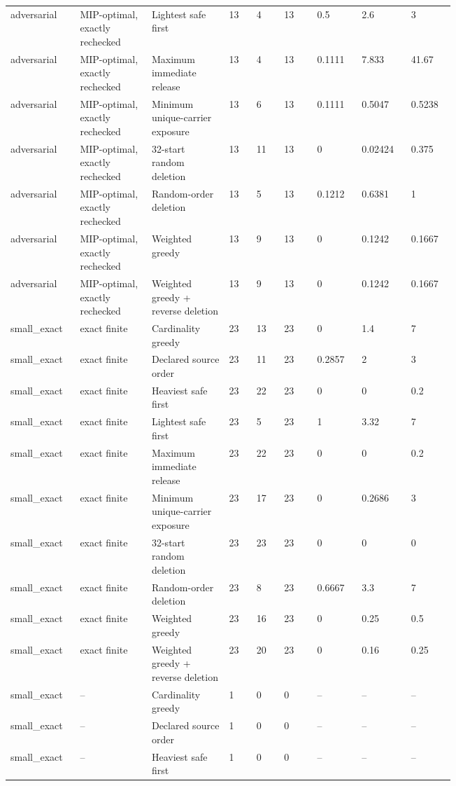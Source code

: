 {\begin{longtable}{p{0.075\linewidth}p{0.13\linewidth}p{0.14\linewidth}p{0.055\linewidth}p{0.055\linewidth}p{0.065\linewidth}p{0.075\linewidth}p{0.075\linewidth}p{0.075\linewidth}}
adversarial & MIP-optimal, exactly rechecked & Lightest safe first & 13 & 4 & 13 & 0.5 & 2.6 & 3 \\
adversarial & MIP-optimal, exactly rechecked & Maximum immediate release & 13 & 4 & 13 & 0.1111 & 7.833 & 41.67 \\
adversarial & MIP-optimal, exactly rechecked & Minimum unique-carrier exposure & 13 & 6 & 13 & 0.1111 & 0.5047 & 0.5238 \\
adversarial & MIP-optimal, exactly rechecked & 32-start random deletion & 13 & 11 & 13 & 0 & 0.02424 & 0.375 \\
adversarial & MIP-optimal, exactly rechecked & Random-order deletion & 13 & 5 & 13 & 0.1212 & 0.6381 & 1 \\
adversarial & MIP-optimal, exactly rechecked & Weighted greedy & 13 & 9 & 13 & 0 & 0.1242 & 0.1667 \\
adversarial & MIP-optimal, exactly rechecked & Weighted greedy + reverse deletion & 13 & 9 & 13 & 0 & 0.1242 & 0.1667 \\
small\_exact & exact finite & Cardinality greedy & 23 & 13 & 23 & 0 & 1.4 & 7 \\
small\_exact & exact finite & Declared source order & 23 & 11 & 23 & 0.2857 & 2 & 3 \\
small\_exact & exact finite & Heaviest safe first & 23 & 22 & 23 & 0 & 0 & 0.2 \\
small\_exact & exact finite & Lightest safe first & 23 & 5 & 23 & 1 & 3.32 & 7 \\
small\_exact & exact finite & Maximum immediate release & 23 & 22 & 23 & 0 & 0 & 0.2 \\
small\_exact & exact finite & Minimum unique-carrier exposure & 23 & 17 & 23 & 0 & 0.2686 & 3 \\
small\_exact & exact finite & 32-start random deletion & 23 & 23 & 23 & 0 & 0 & 0 \\
small\_exact & exact finite & Random-order deletion & 23 & 8 & 23 & 0.6667 & 3.3 & 7 \\
small\_exact & exact finite & Weighted greedy & 23 & 16 & 23 & 0 & 0.25 & 0.5 \\
small\_exact & exact finite & Weighted greedy + reverse deletion & 23 & 20 & 23 & 0 & 0.16 & 0.25 \\
small\_exact & -- & Cardinality greedy & 1 & 0 & 0 & -- & -- & -- \\
small\_exact & -- & Declared source order & 1 & 0 & 0 & -- & -- & -- \\
small\_exact & -- & Heaviest safe first & 1 & 0 & 0 & -- & -- & -- \\

\end{longtable}}

